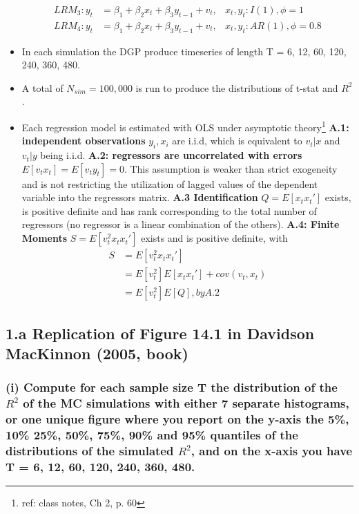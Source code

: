 \documentclass[]{article}
\begin{document}
\begin{itemize}
\begin{align*}
		LRM_3: y_{t} &= \beta_{1} +\beta_{2}x_{t} + \beta_{3}y_{t-1} + v_{t}, &x_t, y_t: I(1), \phi=1\\
		LRM_4: y_{t} &= \beta_{1} +\beta_{2}x_{t} + \beta_{3}y_{t-1} + v_{t}, &x_t, y_t: AR(1), \phi=0.8
	\end{align*}	
	\item In each simulation the DGP produce timeseries of length T = 6, 12, 60, 120, 240, 360, 480.
	\item A total of $N_{sim} = 100,000$ is run to produce the distributions of t-stat and $R^2$.
	\item Each regression model is estimated with OLS under asymptotic theory\footnote{ref: class notes, Ch 2, p. 60}
	\subitem \textbf{A.1: independent observations} $y_i, x_i$ are i.i.d, which is equivalent to $v_t|x$ and $v_t|y$ being i.i.d.
	\subitem \textbf{A.2: regressors are uncorrelated with errors} $E[v_t x_t]=E[v_t y_t]=0$. This assumption is weaker than strict exogeneity and is not restricting the utilization of lagged values of the dependent variable into the regressors matrix.
	\subitem \textbf{A.3 Identification} $Q= E[x_{t}x_{t}']$ exists, is positive definite and has rank corresponding to the total number of regressors (no regressor is a linear combination of the others).
	\subitem \textbf{A.4: Finite Moments } $S = E[v_{t}^2x_{t}x_{t}']$ \alert{exists} and is positive definite, with 
		\begin{align*}
			S &= E[v_{t}^2x_{t}x_{t}']\\
			&= E[v_t^2]E[x_tx_t']+cov(v_t,x_t)\\
			&= E[v_t^2]E[Q], by A.2
		\end{align*}
\end{itemize}

\newpage
\subsection*{1.a Replication of Figure 14.1 in Davidson MacKinnon (2005, book) }
\subsubsection*{(i) Compute for each sample size T the distribution of the $R^2$ of the MC simulations with either 7 separate histograms, or one unique figure where you report on the y-axis the 5\%, 10\% 25\%, 50\%, 75\%, 90\% and 95\% quantiles of the distributions of the simulated $R^2$, and on the x-axis you have T = 6, 12, 60, 120, 240, 360, 480.}
\end{document}
